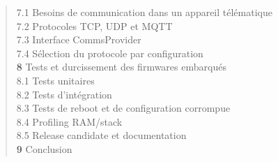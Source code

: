 \begin{quote}
\hspace{2.5em} 7.1 \hspace{0.5em} Besoins de communication dans un appareil télématique \dotfill \pageref{subsec:besoin_comms}\\
\hspace{2.5em} 7.2 \hspace{0.5em} Protocoles TCP, UDP et MQTT \dotfill \pageref{subsec:protocoles}\\
\hspace{2.5em} 7.3 \hspace{0.5em} Interface CommsProvider \dotfill \pageref{subsec:commsprovider}\\
\hspace{2.5em} 7.4 \hspace{0.5em} Sélection du protocole par configuration \dotfill \pageref{subsec:proto_select}\\
\textbf{8} \hspace{1em} Tests et durcissement des firmwares embarqués \dotfill \pageref{sec:tests}\\
\hspace{2.5em} 8.1 \hspace{0.5em} Tests unitaires \dotfill \pageref{subsec:unit_tests}\\
\hspace{2.5em} 8.2 \hspace{0.5em} Tests d'intégration \dotfill \pageref{subsec:integration_tests}\\
\hspace{2.5em} 8.3 \hspace{0.5em} Tests de reboot et de configuration corrompue \dotfill \pageref{subsec:reboot_tests}\\
\hspace{2.5em} 8.4 \hspace{0.5em} Profiling RAM/stack \dotfill \pageref{subsec:profiling}\\
\hspace{2.5em} 8.5 \hspace{0.5em} Release candidate et documentation \dotfill \pageref{subsec:release}\\
\textbf{9} \hspace{1em} Conclusion \dotfill \pageref{sec:conclu_ch2}\\
\end{quote}

\newpage

